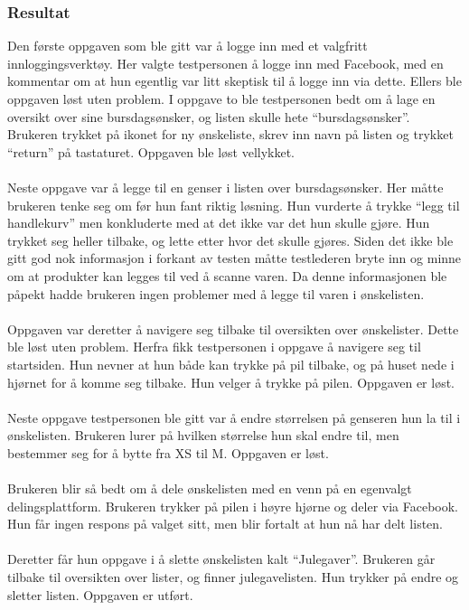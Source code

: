 \subsubsection{Resultat}
Den første oppgaven som ble gitt var å logge inn med et valgfritt innloggingsverktøy. Her valgte testpersonen å logge inn med Facebook, med en kommentar om at hun egentlig var litt skeptisk til å logge inn via dette. Ellers ble oppgaven løst uten problem. 
I oppgave to ble testpersonen bedt om å lage en oversikt over sine bursdagsønsker, og listen skulle hete “bursdagsønsker”. Brukeren trykket på ikonet for ny ønskeliste, skrev inn navn på listen og trykket “return” på tastaturet. Oppgaven ble løst vellykket.
\\\\
Neste oppgave var å legge til en genser i listen over bursdagsønsker. Her måtte brukeren tenke seg om før hun fant riktig løsning. Hun vurderte å trykke “legg til handlekurv” men konkluderte med at det ikke var det hun skulle gjøre. Hun trykket seg heller tilbake, og lette etter hvor det skulle gjøres. Siden det ikke ble gitt god nok informasjon i forkant av testen måtte testlederen bryte inn og minne om at produkter kan legges til ved å scanne varen. Da denne informasjonen ble påpekt hadde brukeren ingen problemer med å legge til varen i ønskelisten.
\\\\
Oppgaven var deretter å navigere seg tilbake til oversikten over ønskelister. Dette ble løst uten problem. Herfra fikk testpersonen i oppgave å navigere seg til startsiden. Hun nevner at hun både kan trykke på pil tilbake, og på huset nede i hjørnet for å komme seg tilbake. Hun velger å trykke på pilen. Oppgaven er løst.
\\\\
Neste oppgave testpersonen ble gitt var å endre størrelsen på genseren hun la til i ønskelisten. Brukeren lurer på hvilken størrelse hun skal endre til, men bestemmer seg for å bytte fra XS til M. Oppgaven er løst. 
\\\\	
Brukeren blir så bedt om å dele ønskelisten med en venn på en egenvalgt delingsplattform. Brukeren trykker på pilen i høyre hjørne og deler via Facebook. Hun får ingen respons på valget sitt, men blir fortalt at hun nå har delt listen.
\\\\
Deretter får hun oppgave i å slette ønskelisten kalt “Julegaver”. Brukeren går tilbake til oversikten over lister, og finner julegavelisten. Hun trykker på endre og sletter listen. Oppgaven er utført.

